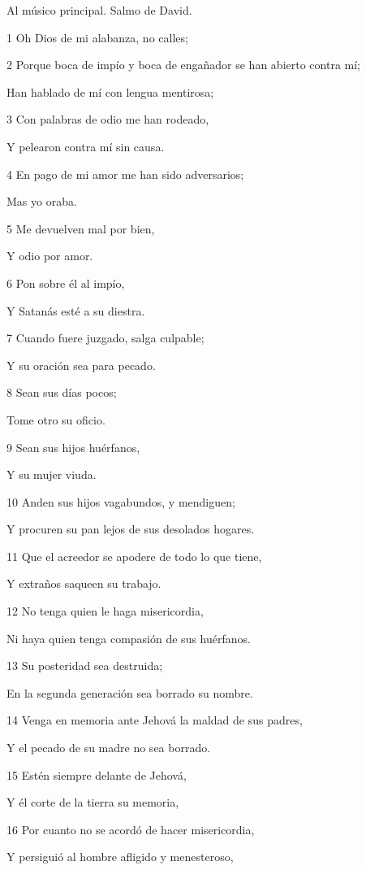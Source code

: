 \par Al músico principal. Salmo de David.

\par 1 Oh Dios de mi alabanza, no calles;
\par 2 Porque boca de impío y boca de engañador se han abierto contra mí;
\par Han hablado de mí con lengua mentirosa;
\par 3 Con palabras de odio me han rodeado,
\par Y pelearon contra mí sin causa.
\par 4 En pago de mi amor me han sido adversarios;
\par Mas yo oraba.
\par 5 Me devuelven mal por bien,
\par Y odio por amor.
\par 6 Pon sobre él al impío,
\par Y Satanás esté a su diestra.
\par 7 Cuando fuere juzgado, salga culpable;
\par Y su oración sea para pecado.
\par 8 Sean sus días pocos;
\par Tome otro su oficio.
\par 9 Sean sus hijos huérfanos,
\par Y su mujer viuda.
\par 10 Anden sus hijos vagabundos, y mendiguen;
\par Y procuren su pan lejos de sus desolados hogares.
\par 11 Que el acreedor se apodere de todo lo que tiene,
\par Y extraños saqueen su trabajo.
\par 12 No tenga quien le haga misericordia,
\par Ni haya quien tenga compasión de sus huérfanos.
\par 13 Su posteridad sea destruida;
\par En la segunda generación sea borrado su nombre.
\par 14 Venga en memoria ante Jehová la maldad de sus padres,
\par Y el pecado de su madre no sea borrado.
\par 15 Estén siempre delante de Jehová,
\par Y él corte de la tierra su memoria,
\par 16 Por cuanto no se acordó de hacer misericordia,
\par Y persiguió al hombre afligido y menesteroso,
